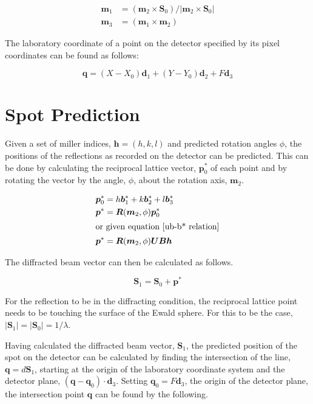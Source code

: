 \documentclass[a4paper,10pt]{article}
\begin{document}
\begin{equation}
  \begin{aligned}
    \bm{m}_1 &= (\bm{m}_2 \times \bm{S}_0) / |\bm{m}_2 \times \bm{S}_0| \\
    \bm{m}_3 &= (\bm{m}_1 \times \bm{m}_2)
  \end{aligned}
\end{equation}

\noindent
The laboratory coordinate of a point on the detector specified by its pixel
coordinates can be found as follows:

\begin{equation}
  \bm{q} = (X - X_0) \bm{d}_1 + (Y - Y_0) \bm{d}_2 + F \bm{d}_3 
  \label{detector point}
\end{equation}


\section{Spot Prediction}

Given a set of miller indices, $\bm{h} = (h, k, l)$ and predicted rotation 
angles $\phi$, the positions of the reflections as recorded on the detector 
can be predicted. This can be done by calculating the reciprocal lattice vector, 
$\bm{p}_0^*$ of each point and by rotating the vector by the angle, $\phi$, 
about the rotation axis, $\bm{m}_2$.

\begin{align*}
  \bm{p}_0^* &= h \bm{b}_1^* + k \bm{b}_2^* + l \bm{b}_3^* \\
  \bm{p}^* &= \bm{R}(\bm{m}_2, \phi) \bm{p}_0^* \\
  \intertext{or given equation \refeq{ub-b* relation}}
  \bm{p}^* &= \bm{R}(\bm{m}_2, \phi) \bm{U} \bm{B} \bm{h}
\end{align*}

The diffracted beam vector can then be calculated as follows. 

\begin{equation}
  \bm{S}_1 = \bm{S}_0 + \bm{p}^* 
\end{equation}

For the reflection to be in the diffracting condition, the reciprocal lattice
point needs to be touching the surface of the Ewald sphere. For this to be the
case, $|\bm{S}_1| = |\bm{S}_0| = 1 / \lambda$.

Having calculated the diffracted beam vector, $\bm{S}_1$, the predicted position
of the spot on the detector can be calculated by finding the intersection of the
line, $\bm{q} = d \bm{S}_1$, starting at the origin of the laboratory coordinate 
system and the detector plane, $(\bm{q} - \bm{q}_0) \cdot \bm{d}_3$. Setting
$\bm{q}_0 = F \bm{d}_3$, the origin of the detector plane, the intersection
point $\bm{q}$ can be found by the following.
\end{document}

